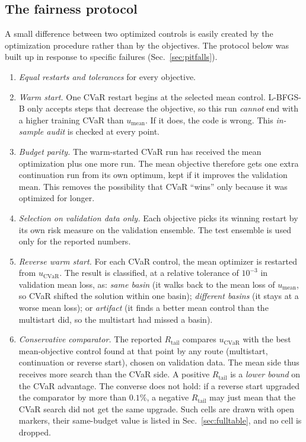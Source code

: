 \documentclass[aps,pra,onecolumn,notitlepage,superscriptaddress,nofootinbib,floatfix]{revtex4-2}
\newcommand{\cvar}{\mathrm{CVaR}}
\newcommand{\Rt}{R_{\mathrm{tail}}}
\newcommand{\umean}{u_{\mathrm{mean}}}
\newcommand{\ucvar}{u_{\cvar}}
\begin{document}
\subsection{The fairness protocol}
\label{sec:fairness}

A small difference between two optimized controls is easily created by
the optimization procedure rather than by the objectives. The protocol below
was built up in response to specific failures (Sec.~\ref{sec:pitfalls}).
\begin{enumerate}[leftmargin=*,itemsep=2pt]
\item \emph{Equal restarts and tolerances} for every objective.
\item \emph{Warm start.} One CVaR restart begins at the selected mean control.
L-BFGS-B only accepts steps that decrease the objective, so this run
\emph{cannot} end with a higher training CVaR than $\umean$. If it does, the
code is wrong. This \emph{in-sample audit} is checked at every point.
\item \emph{Budget parity.} The warm-started CVaR run has received the mean
optimization plus one more run. The mean objective therefore gets one extra
continuation run from its own optimum, kept if it improves the validation
mean. This removes the possibility that CVaR ``wins'' only because it was
optimized for longer.
\item \emph{Selection on validation data only.} Each objective picks its
winning restart by its own risk measure on the validation ensemble. The test
ensemble is used only for the reported numbers.
\item \emph{Reverse warm start.} For each CVaR control, the mean optimizer is
restarted from $\ucvar$. The result is classified, at a relative tolerance
of $10^{-3}$ in validation mean loss, as: \emph{same basin} (it walks back to
the mean loss of $\umean$, so CVaR shifted the solution within one basin);
\emph{different basins} (it stays at a worse mean loss); or \emph{artifact}
(it finds a better mean control than the multistart did, so the multistart
had missed a basin).
\item \emph{Conservative comparator.} The reported $\Rt$ compares $\ucvar$
with the best mean-objective control found at that point by any route
(multistart, continuation or reverse start), chosen on validation data. The
mean side thus receives more search than the CVaR side. A positive $\Rt$ is a
\emph{lower bound} on the CVaR advantage. The converse does not hold: if a
reverse start upgraded the comparator by more than $0.1\%$, a negative $\Rt$
may just mean that the CVaR search did not get the same upgrade. Such cells
are drawn with open markers, their same-budget value is listed in
Sec.~\ref{sec:fulltable}, and no cell is dropped.
\end{enumerate}
\end{document}
